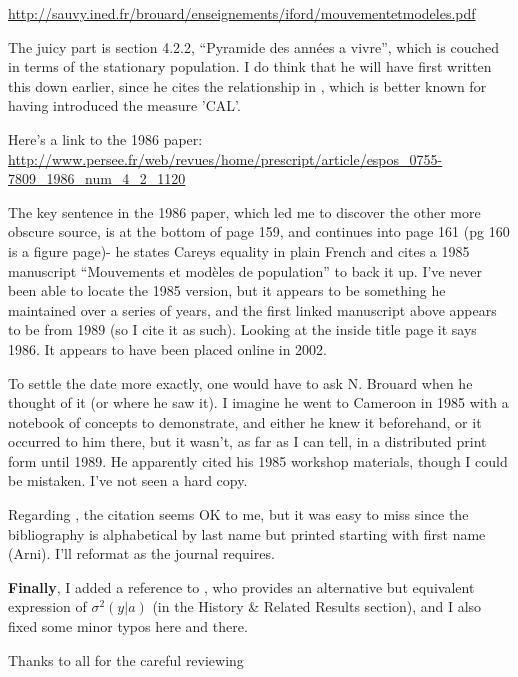 \documentclass{article}
\begin{document}
\url{http://sauvy.ined.fr/brouard/enseignements/iford/mouvementetmodeles.pdf}

The juicy part is section 4.2.2, ``Pyramide des ann\'{e}es a vivre'', which is
couched in terms of the stationary population. I do think that he will have
first written this down earlier, since he cites the relationship in
\citet{brouard1986structure}, which is better known for having introduced the
measure 'CAL'.

Here's a link to the 1986 paper: 
\url{http://www.persee.fr/web/revues/home/prescript/article/espos_0755-7809_1986_num_4_2_1120}

The key sentence in the  1986 paper, which led me to discover the other more
obscure source, is at the bottom of page 159, and continues into page 161 (pg
160 is a figure page)- he states Careys equality in plain French and cites a 1985 manuscript ``Mouvements et mod\`{e}les de population''
to back it up. I've never been able to locate the 1985 version, but it appears
to be something he maintained over a series of years, and the
first linked manuscript above appears to be from 1989 (so I cite it as such). Looking at the inside title page it says 1986. It appears to have been placed online in 2002.

To settle the date more exactly, one would have to ask N. Brouard when he
thought of it (or where he saw it). I imagine he went to Cameroon in 1985 with a
notebook of concepts to demonstrate, and either he knew it beforehand, or it occurred to him there, but it wasn't, as far as I
can tell, in a distributed print form until 1989. He apparently cited his 1985
workshop materials, though I could be mistaken. I've not seen a hard copy.

Regarding \citet{rao2014generalization}, the citation seems OK to me, but it was
easy to miss since the bibliography is alphabetical by last name but printed
starting with first name (Arni). I'll reformat as the journal requires.


\textbf{Finally}, I added a reference to \citet{chiang1984life}, who provides
an alternative but equivalent expression of $\sigma^2(y|a)$ (in the History \&
Related Results section), and I also fixed some minor typos here and there.

Thanks to all for the careful reviewing


   
\end{document}
